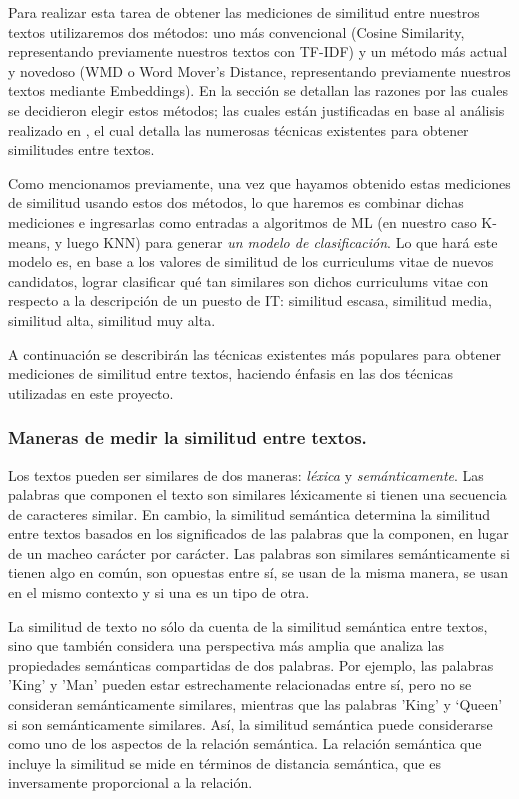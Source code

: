 \documentclass[12pt,a4paper]{article}
\begin{document}
\begin{sloppypar}
Para realizar esta tarea de obtener las mediciones de similitud entre nuestros textos utilizaremos dos métodos: uno más convencional (Cosine Similarity, representando previamente nuestros textos con TF-IDF) y un método más actual y novedoso (WMD o Word Mover’s Distance, representando previamente nuestros textos mediante Embeddings). En la sección \textit{} se detallan las razones por las cuales se decidieron elegir estos métodos; las cuales están justificadas en base al análisis realizado en \textit{}, el cual detalla las numerosas técnicas existentes para obtener similitudes entre textos.

Como mencionamos previamente, una vez que hayamos obtenido estas mediciones de similitud usando estos dos métodos, lo que haremos es combinar dichas mediciones e ingresarlas como entradas a algoritmos de ML (en nuestro caso K-means, y luego KNN) para generar \textit{un modelo de clasificación}. Lo que hará este modelo es, en base a los valores de similitud de los curriculums vitae de nuevos candidatos, lograr clasificar qué tan similares son dichos curriculums vitae con respecto a la descripción de un puesto de IT: similitud escasa, similitud media, similitud alta, similitud muy alta.

A continuación se describirán las técnicas existentes más populares para obtener mediciones de similitud entre textos, haciendo énfasis en las dos técnicas utilizadas en este proyecto. 
\\

\subsubsection{Maneras de medir la similitud entre textos.}\label{Tecnicas_Simil_textos}

Los textos pueden ser similares de dos maneras: \textit{léxica} y \textit{semánticamente}. Las palabras que componen el texto son similares léxicamente si tienen una secuencia de caracteres similar. En cambio, la similitud semántica determina la similitud entre textos basados en los significados de las palabras que la componen, en lugar de un macheo carácter por carácter. Las palabras son similares semánticamente si tienen algo en común, son opuestas entre sí, se usan de la misma manera, se usan en el mismo contexto y si una es un tipo de otra\cite{NLP_16}.

La similitud de texto no sólo da cuenta de la similitud semántica entre textos, sino que también considera una perspectiva más amplia que analiza las propiedades semánticas compartidas de dos palabras. Por ejemplo, las palabras 'King' y 'Man' pueden estar estrechamente relacionadas entre sí, pero no se consideran semánticamente similares, mientras que las palabras 'King' y ‘Queen' si son semánticamente similares. Así, la similitud semántica puede considerarse como uno de los aspectos de la relación semántica. La relación semántica que incluye la similitud se mide en términos de distancia semántica, que es inversamente proporcional a la relación\cite{similarity_survey}.


\end{sloppypar}
\end{document}
